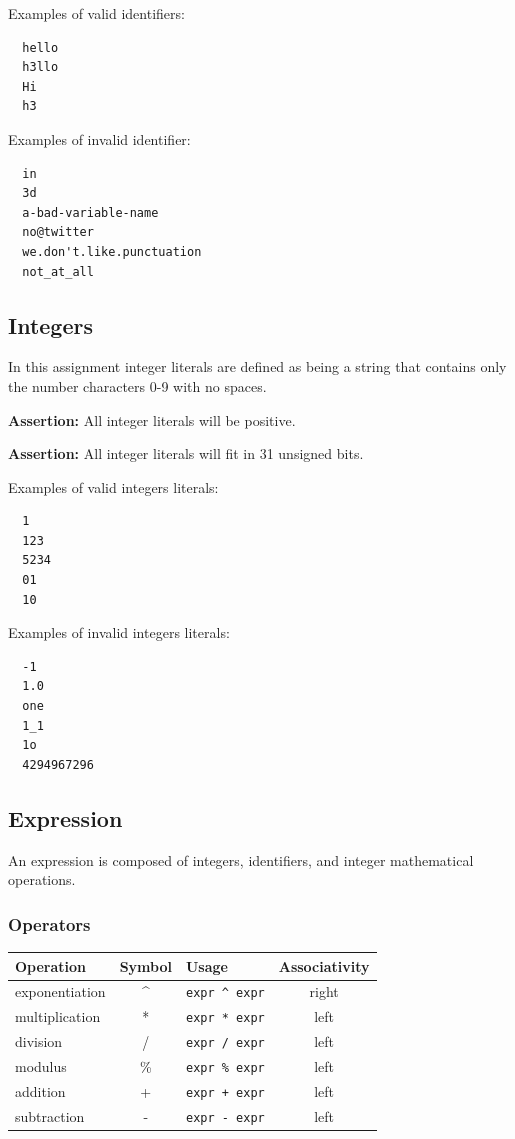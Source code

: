 \documentclass{article}
\newcommand{\code}[1]{\texttt{\textmd{#1}}}
\newcommand{\assertion}[1]{\textbf{Assertion: }#1}
\begin{document}
Examples of valid identifiers:
\begin{lstlisting}
  hello
  h3llo
  Hi
  h3
\end{lstlisting}

Examples of invalid identifier:
\begin{lstlisting}
  in
  3d
  a-bad-variable-name
  no@twitter
  we.don't.like.punctuation
  not_at_all
\end{lstlisting}

\subsection{Integers}
In this assignment integer literals are defined as being a string that contains only the number
characters 0-9 with no spaces.

\assertion{All integer literals will be positive.}

\assertion{All integer literals will fit in 31 unsigned bits.}

Examples of valid integers literals:
\begin{lstlisting}
  1
  123
  5234
  01
  10
\end{lstlisting}

Examples of invalid integers literals:
\begin{lstlisting}
  -1
  1.0
  one
  1_1
  1o
  4294967296
\end{lstlisting}

\subsection{Expression}
An expression is composed of integers, identifiers, and integer mathematical operations.

\subsubsection{Operators}
\begin{center}
  \begin{tabular}{|l|c|l|c|}
    \hline
    \textbf{Operation} & \textbf{Symbol} & \textbf{Usage} &
    \textbf{Associativity} \\
    \hline
    exponentiation & \textasciicircum & \code{expr \textasciicircum\ expr} & right\\
    multiplication & *  & \code{expr * expr}  & left \\
    division       & /  & \code{expr / expr}  & left \\
    modulus        & \% & \code{expr \% expr}  & left \\
    addition       & +  & \code{expr + expr}  & left \\
    subtraction    & -  & \code{expr - expr}  & left \\
    \hline
  \end{tabular}
\end{center}
\end{document}
